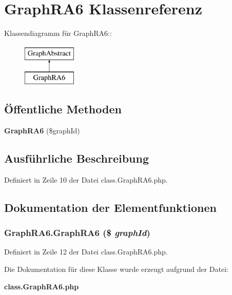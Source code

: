 \section{GraphRA6 Klassenreferenz}
\label{classGraphRA6}
Klassendiagramm für GraphRA6::\begin{figure}[H]
\begin{center}
\leavevmode
\includegraphics[height=2cm]{classGraphRA6}
\end{center}
\end{figure}
\subsection*{Öffentliche Methoden}
\begin{CompactItemize}
\item 
{\bf GraphRA6} (\$graphId)
\end{CompactItemize}


\subsection{Ausführliche Beschreibung}


Definiert in Zeile 10 der Datei class.GraphRA6.php.

\subsection{Dokumentation der Elementfunktionen}
\subsubsection{\setlength{\rightskip}{0pt plus 5cm}GraphRA6.GraphRA6 (\$ {\em graphId})}\label{classGraphRA6_da71fd7949b0b4401b50df2a46dad845}




Definiert in Zeile 12 der Datei class.GraphRA6.php.

Die Dokumentation für diese Klasse wurde erzeugt aufgrund der Datei:\begin{CompactItemize}
\item 
{\bf class.GraphRA6.php}\end{CompactItemize}
